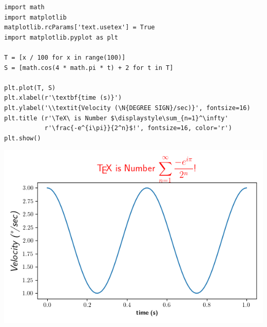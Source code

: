 \begin{codebox}
\begin{verbatim}
import math
import matplotlib
matplotlib.rcParams['text.usetex'] = True
import matplotlib.pyplot as plt

T = [x / 100 for x in range(100)]
S = [math.cos(4 * math.pi * t) + 2 for t in T]

plt.plot(T, S)
plt.xlabel(r'\textbf{time (s)}')
plt.ylabel('\\textit{Velocity (\N{DEGREE SIGN}/sec)}', fontsize=16)
plt.title (r'\TeX\ is Number $\displaystyle\sum_{n=1}^\infty'
           r'\frac{-e^{i\pi}}{2^n}$!', fontsize=16, color='r')
plt.show()
\end{verbatim}
\end{codebox}
%
\begin{tcolorbox}[title=Ausgabe: Mathematisches Pendel mit \LaTeX-Elementen]
\begin{center}
	\includegraphics[width=.7\linewidth]{./gfx/plt-tex}
\end{center}
\end{tcolorbox}

